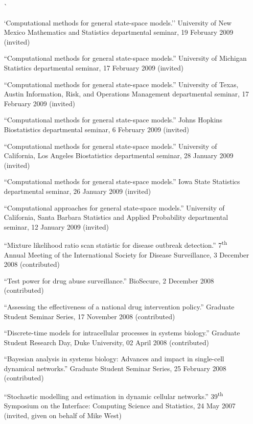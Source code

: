 \documentclass[overlapped,line]{res}
\begin{document}
\begin{resume}
{\newpage\opening 

``Computational methods for general state-space models.'' University of New Mexico Mathematics and Statistics departmental seminar, 19 February 2009 (invited)



``Computational methods for general state-space models.'' University of Michigan Statistics departmental seminar, 17 February 2009 (invited)

``Computational methods for general state-space models.'' University of Texas, Austin Information, Risk, and Operations Management departmental seminar, 17 February 2009 (invited)



``Computational methods for general state-space models.'' Johns Hopkins Biostatistics departmental seminar, 6 February 2009 (invited)

``Computational methods for general state-space models.'' University of California, Los Angeles Biostatistics departmental seminar, 28 January 2009 (invited)

``Computational methods for general state-space models.'' Iowa State Statistics  departmental seminar, 26 January 2009 (invited)

``Computational approaches for general state-space models.'' University of California, Santa Barbara Statistics and Applied Probability departmental seminar, 12 January 2009 (invited)

``Mixture likelihood ratio scan statistic for disease outbreak detection.'' 7\textsuperscript{th} Annual Meeting of the International Society for Disease Surveillance, 3 December 2008 (contributed)

``Test power for drug abuse surveillance.'' BioSecure, 2 December 2008 (contributed)


``Assessing the effectiveness of a national drug intervention policy.'' Graduate Student Seminar Series, 17 November 2008 (contributed)



``Discrete-time models for intracellular processes in systems biology.'' Graduate Student Research Day, Duke University, 02 April 2008 (contributed)

``Bayesian analysis in systems biology: Advances and impact in single-cell dynamical networks.'' Graduate Student Seminar Series, 25 February 2008 (contributed)

``Stochastic modelling and estimation in dynamic cellular networks.'' 39\textsuperscript{th} Symposium on the Interface: Computing Science and Statistics, 24 May 2007 (invited, given on behalf of Mike West)

}
\end{resume}
\end{document}
